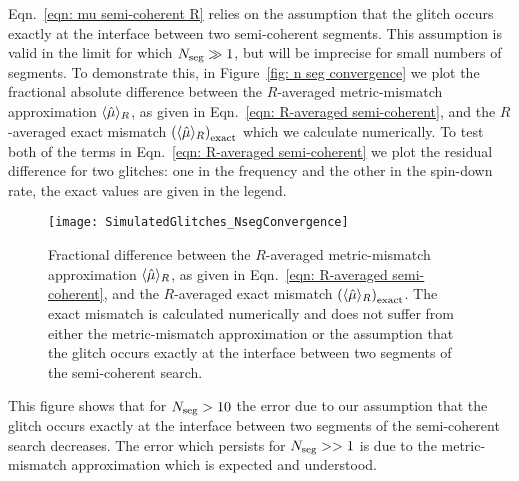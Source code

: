 \documentclass[../full_thesis/full_thesis.tex]{subfiles}
\begin{document}
Eqn.~\eqref{eqn: mu semi-coherent R} relies on the assumption that the glitch
occurs exactly at the interface between two semi-coherent segments. This
assumption is valid in the limit for which $N_{\textrm{seg}} \gg 1$, but will be imprecise
for small numbers of segments. To demonstrate this, in Figure~\ref{fig: n seg
convergence} we plot the fractional absolute difference between the $R$-averaged
metric-mismatch approximation $\langle \hat{\mu} \rangle_R$, as given in
Eqn.~\eqref{eqn: R-averaged semi-coherent}, and the $R$-averaged exact mismatch
$\left(\langle \hat{\mu} \rangle_{R}\right)_{\textrm{exact}}$ which we calculate
numerically. To test both of the terms in Eqn.~\eqref{eqn: R-averaged semi-coherent}
we plot the residual difference for two glitches: one in the frequency and
the other in the spin-down rate, the exact values are given in the legend.
\begin{figure}[htb]
\centering
\texttt{[image: SimulatedGlitches\_NsegConvergence]}
\caption{Fractional difference between the $R$-averaged
metric-mismatch approximation $\langle \hat{\mu} \rangle_R$, as given in
Eqn.~\eqref{eqn: R-averaged semi-coherent}, and the $R$-averaged exact mismatch
$\left(\langle \hat{\mu} \rangle_{R}\right)_{\textrm{exact}}$. The exact mismatch
is calculated numerically and does not suffer from either the metric-mismatch
approximation or the assumption that the glitch occurs exactly at the interface
between two segments of the semi-coherent search.}
\label{fig: n seg convergence}
\end{figure}
This figure shows that for $N_{\textrm{seg}} > 10$ the error due to our assumption that
the glitch occurs exactly at the interface between two segments of the
semi-coherent search decreases. The error which persists for $N_{\textrm{seg}} >> 1$ is
due to the metric-mismatch approximation which is expected and understood.
\end{document}
